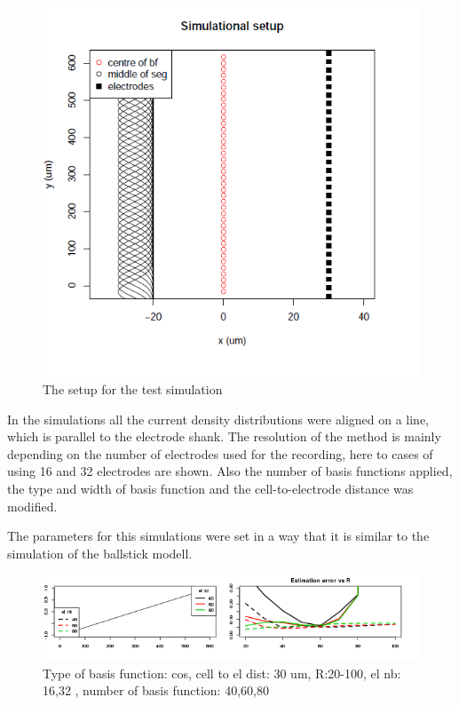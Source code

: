 \documentclass[12pt,a4paper]{article}
\begin{document}
\begin{figure}[h]
\centering
\includegraphics[width= 10 cm]{plots/setup_test.png}
\caption{The setup for the test simulation}
\label{fig: test_setup}
\end{figure}
In the simulations all the current density distributions were aligned on a line, which is parallel to the electrode shank. The resolution of the method is mainly depending on the number of electrodes used for the recording, here to cases of using 16 and 32 electrodes are shown. Also the number of basis functions applied, the type and width of basis function and the cell-to-electrode distance was modified. 


The parameters for this simulations were set in a way that it is similar to the simulation of the ballstick modell.


\begin{figure}[h]
\includegraphics[width=15cm]{plots/error_Rtest_cos_patt1_el_both.png}
\caption{Type of basis function: cos, cell to el dist: 30 um, R:20-100, el nb: 16,32 , number of basis function: 40,60,80}
\label{fig:error_cos0}
\end{figure}
\end{document}
